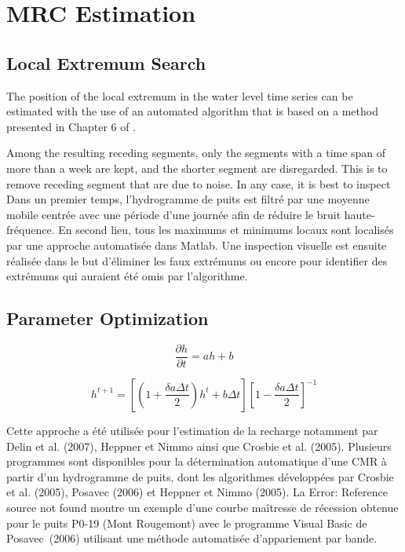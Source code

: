 \documentclass[WHATMANUAL.tex]{subfiles}
\begin{document}
\chapter{MRC Estimation}



\section{Local Extremum Search}

The position of the local extremum in the water level time series can be estimated with the use of an automated algorithm that is based on a method presented in Chapter 6 of \cite{vamos_automatic_2012}.


Among the resulting receding segments, only the segments with a time span of more than a week are kept, and the shorter segment are disregarded. This is to remove receding segment that are due to noise.  In any case, it is best to inspect 
Dans un premier temps, l'hydrogramme de puits est filtré par une moyenne mobile centrée avec une période d'une journée afin de réduire le bruit haute-fréquence. En second lieu, tous les maximums et minimums locaux sont localisés par une approche automatisée dans Matlab. Une inspection visuelle est ensuite réalisée dans le but d'éliminer les faux extrémums ou encore pour identifier des extrémums qui auraient été omis par l'algorithme.

\section{Parameter Optimization}

\begin{equation}
   \frac{\partial h}{\partial t} = ah + b
\end{equation}

\begin{equation}
   h^{t+1} = \left[\left(1 + \frac{\delta a \Delta t}{2}\right)h^t + b \Delta t\right]\left[1 - \frac{\delta a \Delta t}{2}\right]^{-1}
\end{equation}

Cette approche a été utilisée pour l'estimation de la recharge notamment par Delin et al. (2007), Heppner et Nimmo ainsi que Crosbie et al. (2005). Plusieurs programmes sont disponibles pour la détermination automatique d'une CMR à partir d'un hydrogramme de puits, dont les algorithmes développées par Crosbie et al. (2005), Posavec (2006) et Heppner et Nimmo (2005). 
La Error: Reference source not found montre un exemple d'une courbe maîtresse de récession obtenue pour le puits P0-19 (Mont Rougemont) avec le programme Visual Basic de Posavec (2006) utilisant une méthode automatisée d'appariement par bande.
\end{document}
